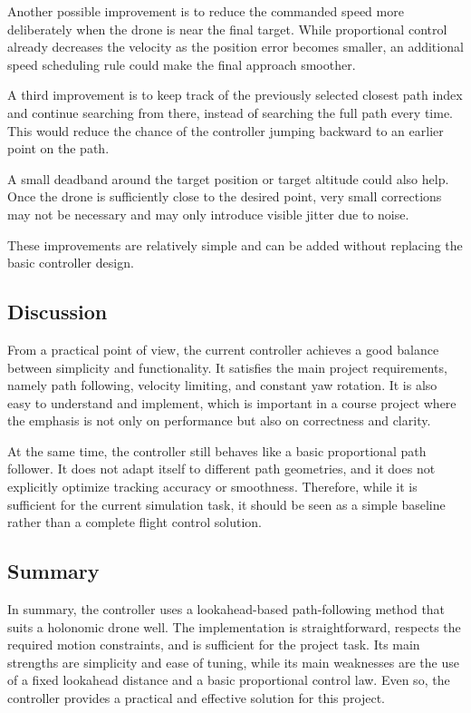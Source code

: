 \documentclass[12pt,twoside,letterpaper]{article}
\begin{document}
Another possible improvement is to reduce the commanded speed more deliberately when the drone is near the final target. While proportional control already decreases the velocity as the position error becomes smaller, an additional speed scheduling rule could make the final approach smoother.

A third improvement is to keep track of the previously selected closest path index and continue searching from there, instead of searching the full path every time. This would reduce the chance of the controller jumping backward to an earlier point on the path.

A small deadband around the target position or target altitude could also help. Once the drone is sufficiently close to the desired point, very small corrections may not be necessary and may only introduce visible jitter due to noise.

These improvements are relatively simple and can be added without replacing the basic controller design.

\subsection{Discussion}

From a practical point of view, the current controller achieves a good balance between simplicity and functionality. It satisfies the main project requirements, namely path following, velocity limiting, and constant yaw rotation. It is also easy to understand and implement, which is important in a course project where the emphasis is not only on performance but also on correctness and clarity.

At the same time, the controller still behaves like a basic proportional path follower. It does not adapt itself to different path geometries, and it does not explicitly optimize tracking accuracy or smoothness. Therefore, while it is sufficient for the current simulation task, it should be seen as a simple baseline rather than a complete flight control solution.

\subsection{Summary}

In summary, the controller uses a lookahead-based path-following method that suits a holonomic drone well. The implementation is straightforward, respects the required motion constraints, and is sufficient for the project task. Its main strengths are simplicity and ease of tuning, while its main weaknesses are the use of a fixed lookahead distance and a basic proportional control law. Even so, the controller provides a practical and effective solution for this project.
\end{document}

